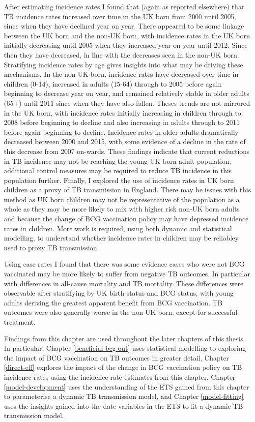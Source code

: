 \documentclass[11pt,twoside]{bristolthesis}
\begin{document}
  After estimating incidence rates I found that (again as reported elsewhere) that TB incidence rates increased over time in the UK born from 2000 until 2005, since when they have declined year on year. There appeared to be some linkage between the UK born and the non-UK born, with incidence rates in the UK born initially decreasing until 2005 when they increased year on year until 2012. Since then they have decreased, in line with the decreases seen in the non-UK born. Stratifying incidence rates by age gives insights into what may be driving these mechanisms. In the non-UK born, incidence rates have decreased over time in children (0-14), increased in adults (15-64) through to 2005 before again beginning to decrease year on year, and remained relatively stable in older adults (65+) until 2011 since when they have also fallen. Theses trends are not mirrored in the UK born, with incidence rates initially increasing in children through to 2008 before beginning to decline and also increasing in adults through to 2011 before again beginning to decline. Incidence rates in older adults dramatically decreased between 2000 and 2015, with some evidence of a decline in the rate of this decrease from 2007 on-wards. These findings indicate that current reductions in TB incidence may not be reaching the young UK born adult population, additional control measures may be required to reduce TB incidence in this population further. Finally, I explored the use of incidence rates in UK born children as a proxy of TB transmission in England. There may be issues with this method as UK born children may not be representative of the population as a whole as they may be more likely to mix with higher risk non-UK born adults and because the change of BCG vaccination policy may have depressed incidence rates in children. More work is required, using both dynamic and statistical modelling, to understand whether incidence rates in children may be reliabley used to proxy TB transmission.
  
  Using case rates I found that there was some evidence cases who were not BCG vaccinated may be more likely to suffer from negative TB outcomes. In particular with differences in all-cause mortality and TB mortality. These differences were observable after stratifying by UK birth status and BCG status, with young adults deriving the greatest apparent benefit from BCG vaccination. TB outcomes were also generally worse in the non-UK born, except for successful treatment.
  
  Findings from this chapter are used throughout the later chapters of this thesis. In particular, Chapter \ref{beneficial-bcg-out} uses statistical modelling to exploring the impact of BCG vaccination on TB outcomes in greater detail, Chapter \ref{direct-eff} explores the impact of the change in BCG vaccination policy on TB incidence rates using the incidence rate estimates from this chapter, Chapter \ref{model-development} uses the understanding of the ETS gained from this chapter to parameterise a dynamic TB transmission model, and Chapter \ref{model-fitting} uses the insights gained into the date variables in the ETS to fit a dynamic TB transmission model.
  
\end{document}
